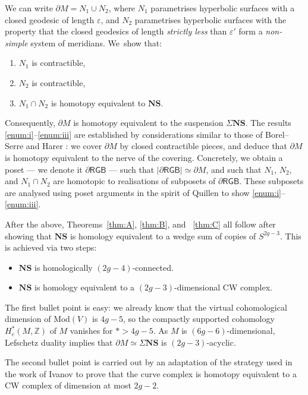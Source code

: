 \documentclass[11pt]{article}
\newenvironment{enumeratei}
{\bgroup\def\theenumi{\roman{enumi}}\def\theenumii{\arabic{enumii}}\begin{enumerate}}
{\end{enumerate}\egroup}
\theoremstyle{plain}
\theoremstyle{definition}
\let\eps\varepsilon
\newcommand{\Z}{\mathbb Z}
\newcommand{\dRGB}{\partial\mathsf{RGB}}
\newcommand{\compNS}{\mathbf{NS}}
\newcommand{\mcg}{\mathrm{Mod}}
\begin{document}
We can write $\partial M = N_1 \cup N_2$, where $N_1$ parametrises hyperbolic surfaces with a closed geodesic of length $\eps$, and $N_2$ parametrises hyperbolic surfaces with the property that the closed geodesics of length \emph{strictly less} than $\eps'$ form a \emph{non-simple} system of meridians. We~show that:
\begin{enumeratei}
\item\label{enum:i} $N_1$ is contractible,
\item\label{enum:ii} $N_2$ is contractible,
\item\label{enum:iii} $N_1 \cap N_2$ is homotopy equivalent to $\compNS$.
\end{enumeratei}
Consequently, $\partial M$ is homotopy equivalent to the suspension $\Sigma \compNS$. The results \hbox{\eqref{enum:i}--\eqref{enum:iii}} are established by considerations similar to those of Borel--Serre \cite{borelserre} and Harer \cite{harer}: we cover $\partial M$ by closed contractible pieces, and deduce that $\partial M$ is homotopy equivalent to the nerve of the covering.
Concretely, we obtain a poset --- we denote it $\dRGB$ --- such that $|\dRGB| \simeq \partial M$, and such that $N_1$, $N_2$, and $N_1 \cap N_2$ are homotopic to realisations of subposets of $\dRGB$. These subposets are analysed using poset arguments in the spirit of Quillen \cite{quillen-homotopyproperties} to show \eqref{enum:i}--\eqref{enum:iii}.

After the above, Theorems~\ref{thm:A}, \ref{thm:B}, and ~\ref{thm:C} all follow after showing that $\compNS$ is homology equivalent to a wedge sum of copies of $S^{2g-3}$. This is achieved via two steps:
\begin{itemize}
\item $\compNS$ is homologically $(2g-4)$-connected.
\item $\compNS$ is homology equivalent to a $(2g-3)$-dimensional CW complex.
\end{itemize}The first bullet point is easy: we already know that the virtual cohomological dimension of $\mcg(V)$ is $4g-5$, so the compactly supported cohomology $H^\ast_c(M,\Z)$ of $M$ vanishes for $\ast > 4g-5$. As $M$ is $(6g-6)$-dimensional, Lefschetz duality implies that $\partial M \simeq \Sigma \compNS$ is $(2g-3)$-acyclic.

The second bullet point is carried out by an adaptation of the strategy used in the work of Ivanov \cite{ivanov} to prove that the curve complex is homotopy equivalent to a CW complex of dimension at most $2g-2$.
\end{document}

